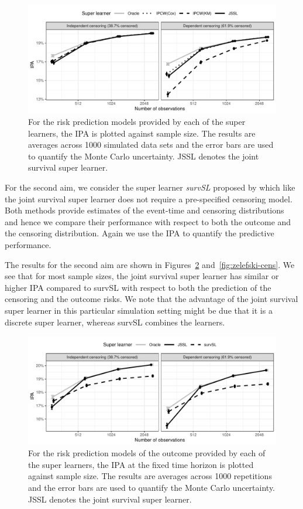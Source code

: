 \documentclass[alpha-refs]{wiley-article}
\newcommand{\1}{\mathds{1}}
\begin{document}
\begin{figure}[ht]
  \includegraphics[width=13cm]{experiment-fig-sl-ipcw}
  \caption{For the risk prediction models provided by each of the
    super learners, the IPA is plotted against sample size. The
    results are averages across 1000 simulated data sets and the error
    bars are used to quantify the Monte Carlo uncertainty. JSSL
    denotes the joint survival super learner. }
\label{fig:ipcw-fail}
\end{figure}
 
For the second aim, we consider the super learner {\it survSL}
proposed by \citep{westling2021inference} which like the joint
survival super learner does not require a pre-specified censoring
model. Both methods provide estimates of the event-time and censoring
distributions and hence we compare their performance with respect to
both the outcome and the censoring distribution. Again we use the IPA
to quantify the predictive performance.

The results for the second aim are shown in
Figures~\ref{fig:zelefski-out} and~\ref{fig:zelefski-cens}. We see
that for most sample sizes, the joint survival super learner has
similar or higher IPA compared to survSL with respect to both the
prediction of the censoring and the outcome risks. We note that the
advantage of the joint survival super learner in this particular
simulation setting might be due that it is a discrete super learner,
whereas survSL combines the learners.


\begin{figure}[ht]
  \includegraphics[width=13cm]{experiment-fig-sl-survSL-out}
\caption{For the risk prediction models of the outcome provided by
  each of the super learners, the IPA at the fixed time horizon is
  plotted against sample size. The results are averages across 1000
  repetitions and the error bars are used to quantify the Monte Carlo
  uncertainty. JSSL denotes the joint survival super learner.}
\label{fig:zelefski-out}
\end{figure}
\end{document}
